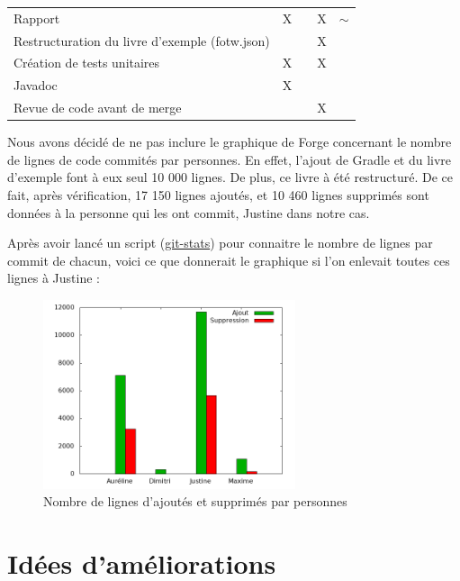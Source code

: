 \begin{centering}
\begin{longtable}{|p{8cm}|c|c|c|c|}
				\rowcolor{lightgray} \multicolumn{5}{|c|}{ \textbf{Autre}}\\
				\hline
				Rapport & X & & X & $\sim$\\
				\hline
				Restructuration du livre d'exemple (fotw.json) & & & X & \\
				\hline
				Création de tests unitaires & X & & X & \\
				\hline
				Javadoc & X & & & \\
				\hline
				Revue de code avant de merge & & & X & \\
				\hline
			\end{longtable}
		\end{centering}

		Nous avons décidé de ne pas inclure le graphique de Forge concernant le nombre de lignes de code commités par personnes. En effet, l'ajout de Gradle et du livre d'exemple font à eux seul 10 000 lignes. De plus, ce livre à été restructuré. De ce fait, après vérification, 17 150 lignes ajoutés, et 10 460 lignes supprimés sont données à la personne qui les ont commit, Justine dans notre cas.

		Après avoir lancé un script (\href{https://gist.github.com/jmartin-pro/64059d16f659421d3ddf3cd43ba75e50}{git-stats}) pour connaitre le nombre de lignes par commit de chacun, voici ce que donnerait le graphique si l'on enlevait toutes ces lignes à Justine :

		\begin{figure}[H]
			\centering\includegraphics[width=0.66\textwidth, keepaspectratio]{img/repo_stats.png}
			\caption{Nombre de lignes d'ajoutés et supprimés par personnes}
		\end{figure}

	\section{Idées d'améliorations}

